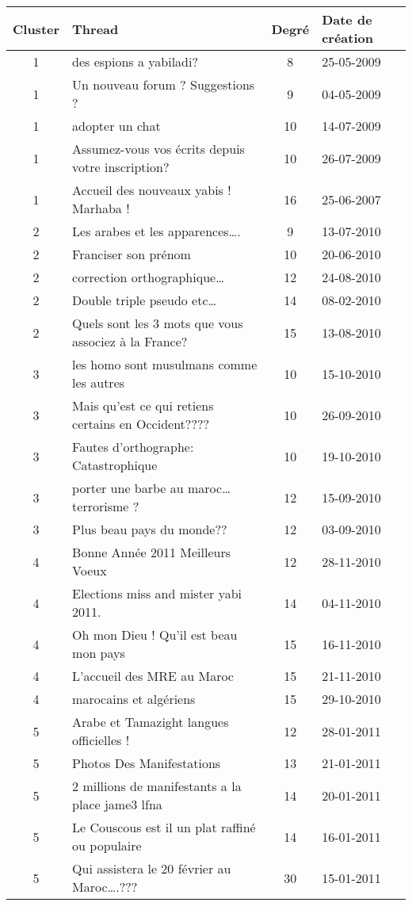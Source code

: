 \documentclass[symmetric,justified,marginals=raggedouter]{tufte-book}
\begin{document}
\begin{table*}
  \label{tab:threads}
  \begin{tabular}{clcl}
    \toprule
    Cluster & Thread & Degré & Date de création\\
    \midrule    
	1&des espions a yabiladi?&8&25-05-2009\\
	1&Un nouveau forum ? Suggestions ?&9&04-05-2009\\
	1&adopter un chat&10&14-07-2009\\
	1&Assumez-vous vos écrits depuis votre inscription?&10&26-07-2009\\
	1&Accueil des nouveaux yabis ! Marhaba !&16&25-06-2007\\
    \midrule 	
	2&Les arabes et les apparences\ldots{}.&9&13-07-2010\\
	2&Franciser son prénom&10&20-06-2010\\
	2&correction orthographique\ldots{}&12&24-08-2010\\
	2&Double triple pseudo etc\ldots{}&14&08-02-2010\\
	2&Quels sont les 3 mots que vous associez à la France?&15&13-08-2010\\
    \midrule 	
	3&les homo sont musulmans comme les autres&10&15-10-2010\\
	3&Mais qu'est ce qui retiens certains en Occident????&10&26-09-2010\\
	3&Fautes d'orthographe: Catastrophique&10&19-10-2010\\
	3&porter une barbe au maroc\ldots{}terrorisme ?&12&15-09-2010\\
	3&Plus beau pays du monde??&12&03-09-2010\\
	\midrule 
	4&Bonne Année 2011 Meilleurs Voeux&12&28-11-2010\\
	4&Elections miss and mister yabi 2011.&14&04-11-2010\\
	4&Oh mon Dieu ! Qu'il est beau mon pays&15&16-11-2010\\
	4&L'accueil des MRE au Maroc&15&21-11-2010\\
	4&marocains et algériens&15&29-10-2010\\
    \midrule 	
	5&Arabe et Tamazight langues officielles !&12&28-01-2011\\
	5&Photos Des Manifestations&13&21-01-2011\\
	5&2 millions de manifestants a la place jame3 lfna&14&20-01-2011\\
	5&Le Couscous est il un plat raffiné ou populaire&14&16-01-2011\\
	5&Qui assistera le 20 février au Maroc\ldots{}.???&30&15-01-2011\\

\end{tabular}
\end{table*}
\end{document}
